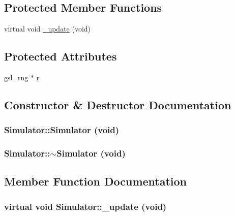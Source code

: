 \subsection*{Protected Member Functions}
\begin{CompactItemize}
\item 
virtual void \hyperlink{class_simulator_d4aa197c02a87ff2653b54c0b9207a33}{\_\-update} (void)
\end{CompactItemize}
\subsection*{Protected Attributes}
\begin{CompactItemize}
\item 
gsl\_\-rng $\ast$ \hyperlink{class_simulator_9e44f21a53c12fb2da041531c41dae8e}{r}
\end{CompactItemize}


\subsection{Constructor \& Destructor Documentation}
\hypertarget{class_simulator_62ab66763cb9e6cccbe88d45ab55547f}{
\subsubsection[{Simulator}]{\setlength{\rightskip}{0pt plus 5cm}Simulator::Simulator (void)}}
\label{class_simulator_62ab66763cb9e6cccbe88d45ab55547f}


\hypertarget{class_simulator_39483d076c375dcf4cb826d828abd530}{
\subsubsection[{$\sim$Simulator}]{\setlength{\rightskip}{0pt plus 5cm}Simulator::$\sim$Simulator (void)}}
\label{class_simulator_39483d076c375dcf4cb826d828abd530}




\subsection{Member Function Documentation}
\hypertarget{class_simulator_d4aa197c02a87ff2653b54c0b9207a33}{
\subsubsection[{\_\-update}]{\setlength{\rightskip}{0pt plus 5cm}virtual void Simulator::\_\-update (void)}}
\label{class_simulator_d4aa197c02a87ff2653b54c0b9207a33}




